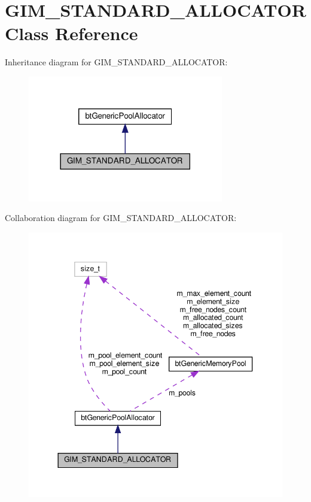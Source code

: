 \hypertarget{classGIM__STANDARD__ALLOCATOR}{}\section{G\+I\+M\+\_\+\+S\+T\+A\+N\+D\+A\+R\+D\+\_\+\+A\+L\+L\+O\+C\+A\+T\+OR Class Reference}
\label{classGIM__STANDARD__ALLOCATOR}


Inheritance diagram for G\+I\+M\+\_\+\+S\+T\+A\+N\+D\+A\+R\+D\+\_\+\+A\+L\+L\+O\+C\+A\+T\+OR\+:
\nopagebreak
\begin{figure}[H]
\begin{center}
\leavevmode
\includegraphics[width=242pt]{classGIM__STANDARD__ALLOCATOR__inherit__graph}
\end{center}
\end{figure}


Collaboration diagram for G\+I\+M\+\_\+\+S\+T\+A\+N\+D\+A\+R\+D\+\_\+\+A\+L\+L\+O\+C\+A\+T\+OR\+:
\nopagebreak
\begin{figure}[H]
\begin{center}
\leavevmode
\includegraphics[width=344pt]{classGIM__STANDARD__ALLOCATOR__coll__graph}
\end{center}
\end{figure}

